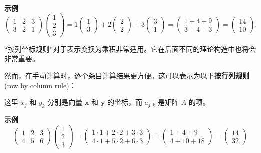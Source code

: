 \textbf{示例}~
$$
\begin{pmatrix} 1 & 2 & 3 \\ 3 & 2 & 1 \end{pmatrix} \begin{pmatrix} 1 \\ 2 \\ 3 \end{pmatrix} = 1 \begin{pmatrix} 1 \\ 3 \end{pmatrix} + 2 \begin{pmatrix} 2 \\ 2 \end{pmatrix} + 3 \begin{pmatrix} 3 \\ 1 \end{pmatrix} = \begin{pmatrix} 1+4+9 \\ 3+4+3 \end{pmatrix} = \begin{pmatrix} 14 \\ 10 \end{pmatrix}.
$$

“按列坐标规则”对于表示变换为乘积非常适用。它在后面不同的理论构造中也将会非常重要。

然而，在手动计算时，逐个条目计算结果更方便。这可以表示为以下\textbf{按行列规则}(row by column rule)：



这里 $x_j$ 和 $y_k$ 分别是向量 $\mathbf{x}$ 和 $\mathbf{y}$ 的坐标，而 $a_{j,k}$ 是矩阵 $A$ 的项。

\textbf{示例}~
$$
\begin{pmatrix} 1 & 2 & 3 \\ 4 & 5 & 6 \end{pmatrix} \begin{pmatrix} 1 \\ 2 \\ 3 \end{pmatrix} = \begin{pmatrix} 1 \cdot 1 + 2 \cdot 2 + 3 \cdot 3 \\ 4 \cdot 1 + 5 \cdot 2 + 6 \cdot 3 \end{pmatrix} = \begin{pmatrix} 1+4+9 \\ 4+10+18 \end{pmatrix} = \begin{pmatrix} 14 \\ 32 \end{pmatrix}
$$


